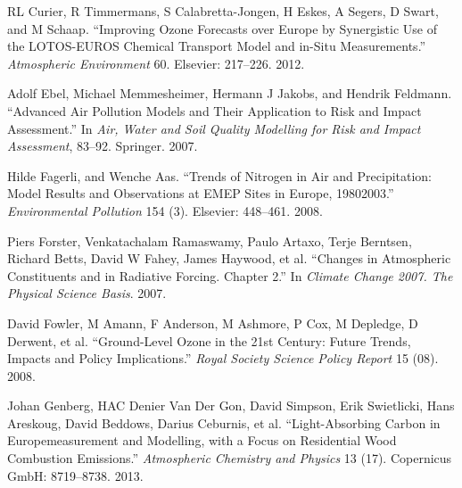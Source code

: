\documentclass[9pt]{report}
\begin{document}
{\begin{thebibliography}{32}
RL Curier, R Timmermans, S Calabretta-Jongen, H Eskes, A Segers, D Swart, and M Schaap. \textquotedblleft{}Improving Ozone Forecasts over Europe by Synergistic Use of the LOTOS-EUROS Chemical Transport Model and in-Situ Measurements.\textquotedblright{} \emph{Atmospheric Environment} 60. Elsevier: 217–226. 2012.\label{curier2012improving}%

Adolf Ebel, Michael Memmesheimer, Hermann J Jakobs, and Hendrik Feldmann. \textquotedblleft{}Advanced Air Pollution Models and Their Application to Risk and Impact Assessment.\textquotedblright{} In \emph{Air, Water and Soil Quality Modelling for Risk and Impact Assessment}, 83–92. Springer. 2007.\label{ebel2007advanced}%

Hilde Fagerli, and Wenche Aas. \textquotedblleft{}Trends of Nitrogen in Air and Precipitation: Model Results and Observations at EMEP Sites in Europe, 1980\textendash{}2003.\textquotedblright{} \emph{Environmental Pollution} 154 (3). Elsevier: 448–461. 2008.\label{fagerli2008trends}%

Piers Forster, Venkatachalam Ramaswamy, Paulo Artaxo, Terje Berntsen, Richard Betts, David W Fahey, James Haywood, et al. \textquotedblleft{}Changes in Atmospheric Constituents and in Radiative Forcing. Chapter 2.\textquotedblright{} In \emph{Climate Change 2007. The Physical Science Basis}. 2007.\label{forster2007changes}%

David Fowler, M Amann, F Anderson, M Ashmore, P Cox, M Depledge, D Derwent, et al. \textquotedblleft{}Ground-Level Ozone in the 21st Century: Future Trends, Impacts and Policy Implications.\textquotedblright{} \emph{Royal Society Science Policy Report} 15 (08). 2008.\label{fowler2008ground}%

Johan Genberg, HAC Denier Van Der Gon, David Simpson, Erik Swietlicki, Hans Areskoug, David Beddows, Darius Ceburnis, et al. \textquotedblleft{}Light-Absorbing Carbon in Europe\textendash{}measurement and Modelling, with a Focus on Residential Wood Combustion Emissions.\textquotedblright{} \emph{Atmospheric Chemistry and Physics} 13 (17). Copernicus GmbH: 8719–8738. 2013.\label{genberg2013light}%


\end{thebibliography}}
\end{document}
